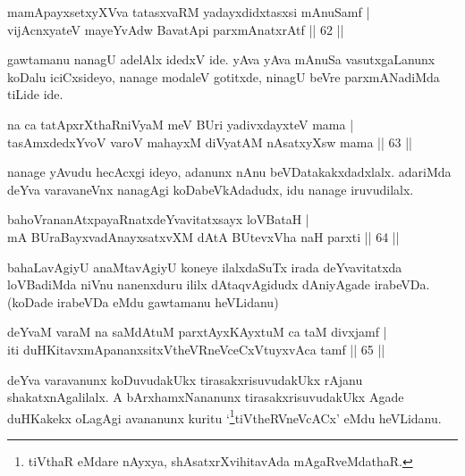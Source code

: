 \begin{shl}
mamApayxsetxyXVva tatasxvaRM yadayxdidxtasxsi mAnuSamf | \\
vijAcnxyateV mayeYvA\s \s dw BavatA\s pi parxmAnatxrAtf \hfill|| 62 || 
\end{shl}

\begin{artha}
gawtamanu nanagU adelAlx idedxV ide. yAva yAva mAnuSa vasutxgaLanunx 
koDalu iciCxsideyo, nanage modaleV gotitxde, ninagU beVre parxmANadiMda 
tiLide ide.
\end{artha}

\begin{shl}
na ca tatApxrXthaRniVyaM meV BUri yadivxdayxteV mama | \\
tasAmxdedxYvoV varoV mahayxM diVyatAM nAsatxyXsw mama \hfill|| 63 || 
\end{shl}

\begin{artha}
nanage yAvudu hecAcxgi ideyo, adanunx nAnu beVDatakakxdadxlalx. adariMda deYva varavaneVnx nanagAgi koDabeVkAdadudx, idu nanage iruvudilalx.
\end{artha}


\begin{shl}
bahoVrananAtxpayaRnatxdeYvavitatxsayx loVBataH | \\
mA BUraBayxvadAnayxsatxvXM dAtA BUtevxVha naH parxti \hfill|| 64 || 
\end{shl}

\begin{artha}
bahaLavAgiyU anaMtavAgiyU koneye ilalxdaSuTx irada deYvavitatxda loVBadiMda niVnu nanenxduru ililx dAtaqvAgidudx dAniyAgade irabeVDa. (koDade irabeVDa eMdu gawtamanu heVLidanu)
\end{artha}


\begin{shl}
deYvaM varaM na saMdAtuM parxtAyxKAyxtuM ca taM divxjamf | \\
iti duHKitavxmApananxsitxVtheVRneVceCxVtuyxvAca tamf \hfill|| 65 || 
\end{shl}

\begin{artha}
deYva varavanunx koDuvudakUkx tirasakxrisuvudakUkx rAjanu 
shakatxnAgalilalx. A bArxhamxNananunx tirasakxrisuvudakUkx Agade 
duHKakekx oLagAgi avananunx kuritu `\footnote[1]{tiVthaR eMdare 
nAyxya, shAsatxrXvihitavAda mAgaRveMdathaR.}tiVtheRVneVcACx' eMdu heVLidanu.
\end{artha}


